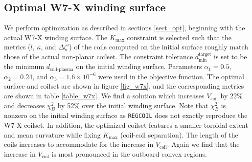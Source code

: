 \documentclass[aps,unsortedaddress]{revtex4-1}
\begin{document}
\subsection{Optimal W7-X winding surface}
\FloatBarrier
We perform optimization as described in sections \ref{sect_opt}, beginning with the actual W7-X winding surface. The $K_{\text{max}}$ constraint is selected such that the metrics ($l$, $\kappa$, and $\Delta \zeta'$) of the coils computed on the initial surface roughly match those of the actual non-planar coilset. The constraint tolerance $d_{\text{min}}^{\text{target}}$ is set to be the minimum $d_{\text{coil-plasma}}$ on the initial winding surface. Parameters $\alpha_1 = 0.5$, $\alpha_2 = 0.24$, and $\alpha_3 = 1.6\times10^{-6}$ were used in the objective function. The optimal surface and coilset are shown in figure \ref{fig_w7x}, and the corresponding metrics are shown in table \ref{table_w7x}. We find a solution which increases $V_{\text{coil}}$ by 22\% and decreases $\chi^2_B$ by 52\% over the initial winding surface. Note that $\chi^2_B$ is nonzero on the initial winding surface as \texttt{REGCOIL} does not exactly reproduce the W7-X coilset. In addition, the optimized coilset features a smaller toroidal extent and mean curvature while fixing $K_{\text{max}}$ (coil-coil separation). The length of the coils increases to accommodate for the increase in $V_{\text{coil}}$. Again we find that the increase in $V_{\text{coil}}$ is most pronounced in the outboard convex regions. 
\end{document}
